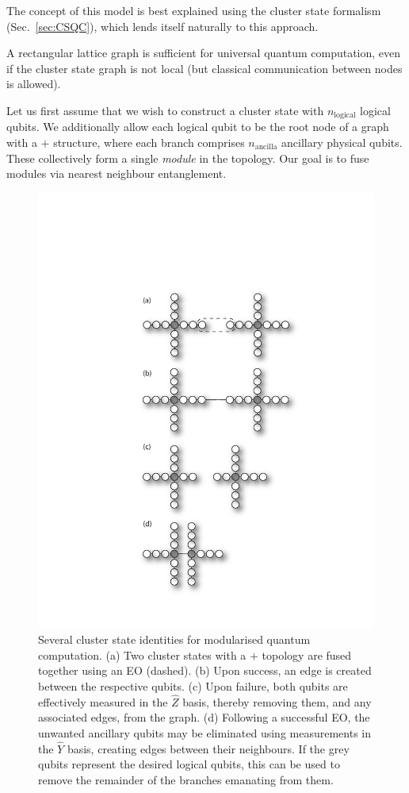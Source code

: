 \documentclass[aps,rmp,twocolumn,amsmath,amssymb,nofootinbib,superscriptaddress]{revtex4}
\begin{document}
The concept of this model is best explained using the cluster state formalism (Sec.~\ref{sec:CSQC}), which lends itself naturally to this approach.

A rectangular lattice graph is sufficient for universal quantum computation, even if the cluster state graph is not local (but classical communication between nodes is allowed).

Let us first assume that we wish to construct a cluster state with $n_\mathrm{logical}$ logical qubits. We additionally allow each logical qubit to be the root node of a graph with a $+$ structure, where each branch comprises $n_\mathrm{ancilla}$ ancillary physical qubits. These collectively form a single \emph{module} in the topology. Our goal is to fuse modules via nearest neighbour entanglement.

\begin{figure}[!htb]
\includegraphics[width=0.9\columnwidth]{cluster_ident}
\caption{Several cluster state identities for modularised quantum computation. (a) Two cluster states with a $+$ topology are fused together using an EO (dashed). (b) Upon success, an edge is created between the respective qubits. (c) Upon failure, both qubits are effectively measured in the $\hat{Z}$ basis, thereby removing them, and any associated edges, from the graph. (d) Following a successful EO, the unwanted ancillary qubits may be eliminated using measurements in the $\hat{Y}$ basis, creating edges between their neighbours. If the grey qubits represent the desired logical qubits, this can be used to remove the remainder of the branches emanating from them.} \label{fig:plus_cluster_ident}
\end{figure}
\end{document}
